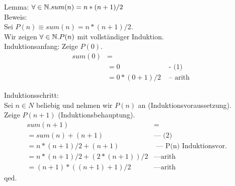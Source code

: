 		Lemma: $\forall \in \mathbb{N}. sum(n) = n*(n+1)/2$ \\
		Beweis: \\
		  Sei $P(n) \equiv sum(n) = n*(n+1)/2$. \\
		  Wir zeigen $\forall \in \mathbb{N}. P(n)$ mit vollständiger Induktion.\\
		
		  Induktionsanfang: Zeige $P(0)$. \\
		\begin{align}
		        sum(0) &= &\\
		     &= 0          & \text{ - (1)} \\
		     & = 0*(0+1)/2  & \text{ – arith}
		\end{align}
		
		  Induktionsschritt: \\
		    Sei $n \in N$ beliebig und nehmen wir $P(n)$ an (Induktionsvoraussetzung).  \\
		    Zeige $P(n+1)$ (Induktionsbehauptung).\\
		  \begin{align}
		        sum (n+1)&=&\\
		      = sum(n) + (n+1)            & \text{— (2)}\\
		      = n*(n+1)/2 + (n+1)       & \text{ — P(n) Induktionsvor. }\\
		      = n*(n+1)/2 + (2*(n+1))/2  & \text{—arith}\\
		      = (n+1)*((n+1)+1)/2        & \text{—arith}
		\end{align}
		qed.
